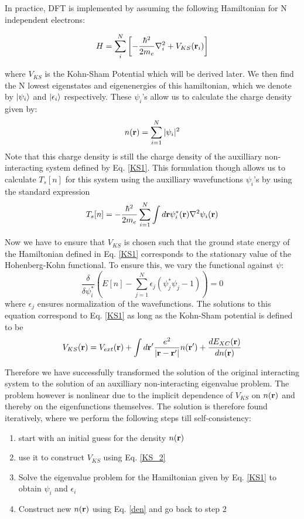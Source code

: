 \documentclass[10pt]{ruthesis}
\begin{document}
In practice, DFT is implemented by  assuming the following Hamiltonian for N independent electrons:

\begin{equation} \label{KS1}
H=\sum_{i}^{N} \left[ -\dfrac{\hbar^2}{2m_e}\nabla_i^2 +V_{KS}(\mathbf{r}_i)\right]
\end{equation}

 where $V_{KS}$ is the Kohn-Sham Potential which will be derived later. We then find the N lowest eigenstates and eigenenergies of this hamiltonian, which we denote by $|\psi_i\rangle$
 and $|\epsilon_i\rangle$ respectively. These $\psi_i$'s allow us to calculate the charge density given by:
 \begin{equation}\label{den}
 n(\mathbf{r})=\sum_{i=1}^{N} |\psi_i|^2
 \end{equation}
  Note that this charge density is still the charge density of the auxilliary non-interacting system defined by Eq. \ref{KS1}. This formulation though allows us to calculate $T_s[n]$ for this system using the auxilliary wavefunctions $\psi_i$'s by using the standard expression
 \begin{equation}
 T_s[n]=-\dfrac{\hbar^2}{2m_e} \sum_{i=1}^{N} \int d\mathbf{r} \psi^*_i(\mathbf{r}) \nabla^2 \psi_i(\mathbf{r})
 \end{equation}
 
 Now we have to ensure that $V_{KS}$ is chosen such that the ground state energy of the Hamiltonian defined in Eq. \ref{KS1} corresponds to the stationary value of the Hohenberg-Kohn functional. To ensure this, we vary the functional against  $\psi$:
 \begin{equation}
  \dfrac{\delta}{\delta \psi_i^*}\left( E[n] - \sum_{j=1}^{N} \epsilon_j (\psi^*_j \psi_j -1) \right)=0
  \end{equation} 
  where $\epsilon_j$ ensures normalization of the wavefunctions. The solutions to this equation correspond to Eq. \ref{KS1} as long as the Kohn-Sham potential is defined to be
 \begin{equation}\label{KS_2}
 V_{KS}(\mathbf{r})=V_{ext}(\mathbf{r}) + \int d\mathbf{r}' \dfrac{e^2}{|\mathbf{r} -\mathbf{r}'|} n(\mathbf{r}') + \dfrac{d E_{XC}(\mathbf{r})}{dn(\mathbf{r})}
 \end{equation}

Therefore we have successfully transformed the solution of the original interacting system to the solution of an auxilliary non-interacting eigenvalue problem. The problem however is nonlinear due to the implicit dependence of $V_{KS}$ on $n(\mathbf{r})$ and thereby on the eigenfunctions themselves. The solution is therefore found iteratively, where we perform the following steps till self-consistency:
\begin{enumerate}
\item start with an initial guess for the density $n(\mathbf{r})$
\item use it to construct $V_{KS}$ using Eq. \ref{KS_2}
\item Solve the eigenvalue problem for the Hamiltonian given by Eq. \ref{KS1} to obtain $\psi_i$ and $\epsilon_i$ 
\item Construct new $n(\mathbf{r})$ using Eq. \ref{den} and go back to step 2
\end{enumerate}
\end{document}
